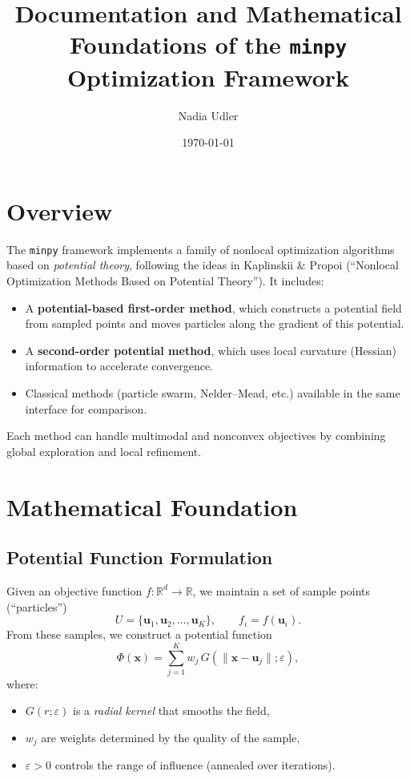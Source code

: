 \documentclass[12pt]{article}
\title{\textbf{Documentation and Mathematical Foundations of the \texttt{minpy} Optimization Framework}}
\author{Nadia Udler}
\date{\today}
\begin{document}
\maketitle

\section{Overview}

The \texttt{minpy} framework implements a family of nonlocal optimization algorithms based on \emph{potential theory}, following the ideas in Kaplinskii \& Propoi (``Nonlocal Optimization Methods Based on Potential Theory'').  It includes:

\begin{itemize}
    \item A \textbf{potential-based first-order method}, which constructs a potential field from sampled points and moves particles along the gradient of this potential.
    \item A \textbf{second-order potential method}, which uses local curvature (Hessian) information to accelerate convergence.
    \item Classical methods (particle swarm, Nelder–Mead, etc.) available in the same interface for comparison.
\end{itemize}

Each method can handle multimodal and nonconvex objectives by combining global exploration and local refinement.

\section{Mathematical Foundation}

\subsection{Potential Function Formulation}

Given an objective function $f: \mathbb{R}^d \to \mathbb{R}$, we maintain a set of sample points (``particles'')
\[
U = \{ \mathbf{u}_1, \mathbf{u}_2, \ldots, \mathbf{u}_K \}, \qquad f_i = f(\mathbf{u}_i).
\]
From these samples, we construct a potential function
\[
\Phi(\mathbf{x}) = \sum_{j=1}^K w_j \, G\!\left(\|\mathbf{x} - \mathbf{u}_j\|; \varepsilon\right),
\]
where:
\begin{itemize}
    \item $G(r; \varepsilon)$ is a \emph{radial kernel} that smooths the field,
    \item $w_j$ are weights determined by the quality of the sample,
    \item $\varepsilon > 0$ controls the range of influence (annealed over iterations).
\end{itemize}
\end{document}
